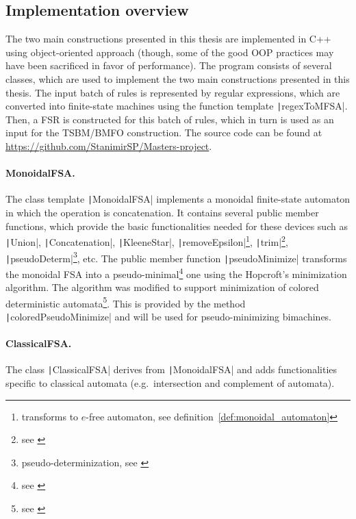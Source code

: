 \documentclass{article}
\begin{document}
	\subsection{Implementation overview} \label{subsection:implementation:description}
	The two main constructions presented in this thesis are implemented in C++ using object-oriented approach (though, some of the good OOP practices may have been sacrificed in favor of performance).
	The program consists of several classes, which are used to implement the two main constructions presented in this thesis.
	The input batch of rules is represented by regular expressions, which are converted into finite-state machines using the function template \texttt|regexToMFSA|. Then, a FSR is constructed for this batch of rules, which in turn is used as an input for the TSBM/BMFO construction.
	The source code can be found at \url{https://github.com/StanimirSP/Masters-project}.
	
	\paragraph{MonoidalFSA.} The class template \texttt|MonoidalFSA| implements a monoidal finite-state automaton in which the operation is concatenation. It contains several public member functions, which provide the basic functionalities needed for these devices such as \texttt|Union|, \texttt|Concatenation|, \texttt|KleeneStar|,
	\texttt|removeEpsilon|\footnote{transforms to $e$-free automaton, see definition~\ref{def:monoidal_automaton}},
	\texttt|trim|\footnote{see \cite[definition~2.5.1]{Mihov-FST-2019}},
	\texttt|pseudoDeterm|\footnote{pseudo-determinization, see \cite[definition~3.7.1]{Mihov-FST-2019}}, etc.
	The public member function \texttt|pseudoMinimize| transforms the monoidal FSA into a pseudo-minimal\footnote{see \cite[definition~3.7.3]{Mihov-FST-2019}} one using the Hopcroft's minimization algorithm. The algorithm was modified to support minimization of colored deterministic automata\footnote{see \cite[section~3.6]{Mihov-FST-2019}}. This is provided by the method \texttt|coloredPseudoMinimize| and will be used for pseudo-minimizing bimachines.
		
	\paragraph{ClassicalFSA.} The class \texttt|ClassicalFSA| derives from \texttt|MonoidalFSA| and adds functionalities specific to classical automata (e.g.\ intersection and complement of automata).
	
\end{document}
